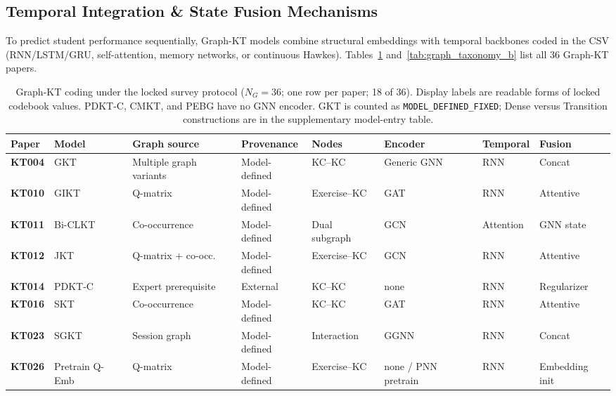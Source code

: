 \documentclass[lettersize,journal]{IEEEtran}
\begin{document}
\subsection{Temporal Integration \& State Fusion Mechanisms}
To predict student performance sequentially, Graph-KT models combine structural embeddings with temporal backbones coded in the CSV (RNN/LSTM/GRU, self-attention, memory networks, or continuous Hawkes). Tables~\ref{tab:graph_taxonomy} and~\ref{tab:graph_taxonomy_b} list all 36 Graph-KT papers.

\begin{table}[t]
\caption{Graph-KT coding under the locked survey protocol ($N_G=36$; one row per paper; 18 of 36). Display labels are readable forms of locked codebook values. PDKT-C, CMKT, and PEBG have no GNN encoder. GKT is counted as \texttt{MODEL\_DEFINED\_FIXED}; Dense versus Transition constructions are in the supplementary model-entry table.}
\label{tab:graph_taxonomy}
\centering
\footnotesize
\setlength{\tabcolsep}{3.5pt}
\begin{tabular}{@{}ll>{\raggedright\arraybackslash}p{2.15cm}l>{\raggedright\arraybackslash}p{1.55cm}lll@{}}
\toprule
\textbf{Paper} & \textbf{Model} & \textbf{Graph source} & \textbf{Provenance} & \textbf{Nodes} & \textbf{Encoder} & \textbf{Temporal} & \textbf{Fusion} \\
\midrule
\textbf{KT004} & GKT \cite{KT004_GKT_2019} & Multiple graph variants & Model-defined & KC--KC & Generic GNN & RNN & Concat \\
\textbf{KT010} & GIKT \cite{KT010_GIKT_2021} & Q-matrix & Model-defined & Exercise--KC & GAT & RNN & Attentive \\
\textbf{KT011} & Bi-CLKT \cite{KT011_BiCLKT_2022} & Co-occurrence & Model-defined & Dual subgraph & GCN & Attention & GNN state \\
\textbf{KT012} & JKT \cite{KT012_JKT_2021} & Q-matrix + co-occ. & Model-defined & Exercise--KC & GCN & RNN & Attentive \\
\textbf{KT014} & PDKT-C \cite{KT014_PDKTC_2018} & Expert prerequisite & External & KC--KC & none & RNN & Regularizer \\
\textbf{KT016} & SKT \cite{KT016_SKT_2020} & Co-occurrence & Model-defined & KC--KC & GAT & RNN & Attentive \\
\textbf{KT023} & SGKT \cite{KT023_SGKT_2022} & Session graph & Model-defined & Interaction & GGNN & RNN & Concat \\
\textbf{KT026} & Pretrain Q-Emb \cite{KT026_PretrainQ_2020} & Q-matrix & Model-defined & Exercise--KC & none / PNN pretrain & RNN & Embedding init \\

\end{tabular}
\end{table}
\end{document}
